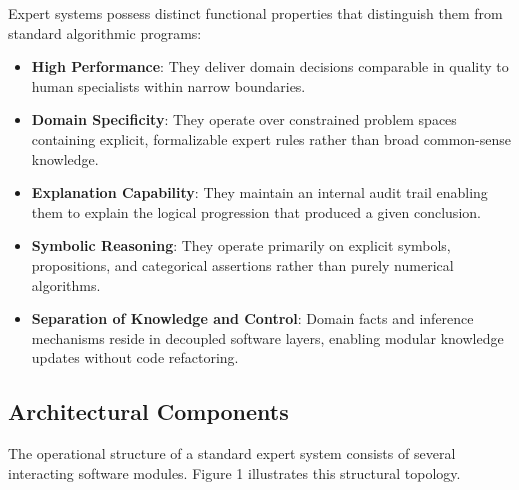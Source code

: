 \documentclass[12pt]{report}
\begin{document}
Expert systems possess distinct functional properties that distinguish them from standard algorithmic programs:

\begin{itemize}
    \item \textbf{High Performance}: They deliver domain decisions comparable in quality to human specialists within narrow boundaries.
    \item \textbf{Domain Specificity}: They operate over constrained problem spaces containing explicit, formalizable expert rules rather than broad common-sense knowledge.
    \item \textbf{Explanation Capability}: They maintain an internal audit trail enabling them to explain the logical progression that produced a given conclusion.
    \item \textbf{Symbolic Reasoning}: They operate primarily on explicit symbols, propositions, and categorical assertions rather than purely numerical algorithms.
    \item \textbf{Separation of Knowledge and Control}: Domain facts and inference mechanisms reside in decoupled software layers, enabling modular knowledge updates without code refactoring.
\end{itemize}

\subsection{Architectural Components}

The operational structure of a standard expert system consists of several interacting software modules. Figure 1 illustrates this structural topology.
\end{document}
